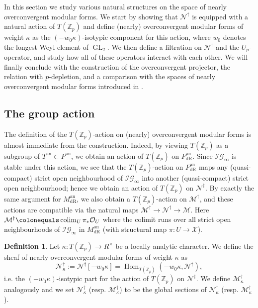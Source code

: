 \documentclass[10pt, oneside]{amsart}
\newcommand{\defeq}{\colonequals}
\numberwithin{equation}{subsection}
\theoremstyle{definition}
\newtheorem{definition}[equation]{Definition}
\theoremstyle{remark}
\newcommand{\mbb}[1]{\mathbb{#1}}
\newcommand{\opn}[1]{\operatorname{#1}}
\begin{document}
In this section we study various natural structures on the space of nearly overconvergent modular forms. We start by showing that $\mathcal{N}^\dagger$ is equipped with a natural action of $T(\mbb{Z}_p)$ and define (nearly) overconvergent modular forms of weight $\kappa$ as the $(-w_0\kappa)$-isotypic component for this action, where $w_0$ denotes the longest Weyl element of $\opn{GL}_2$. We then define a filtration on $\mathcal{N}^\dagger$ and the $U_p$-operator, and study how all of these operators interact with each other. We will finally conclude with the construction of the overconvergent projector, the relation with $p$-depletion, and a comparison with the spaces of nearly overconvergent modular forms introduced in \cite{AI_LLL}.


\subsection{The group action}

The definition of the $T(\mbb{Z}_p)$-action on (nearly) overconvergent modular forms is almost immediate from the construction. Indeed, by viewing $T(\mbb{Z}_p)$ as a subgroup of $T^{\opn{an}} \subset P^{\opn{an}}$, we obtain an action of $T(\mbb{Z}_p)$ on $P_{\opn{dR}}^{\opn{an}}$. Since $\mathcal{IG}_{\infty}$ is stable under this action, we see that the $T(\mbb{Z}_p)$-action on $P_{\opn{dR}}^{\opn{an}}$ maps any (quasi-compact) strict open neighbourhood of $\mathcal{IG}_{\infty}$ into another (quasi-compact) strict open neighbourhood; hence we obtain an action of $T(\mbb{Z}_p)$ on $\mathcal{N}^{\dagger}$. By exactly the same argument for $M_{\opn{dR}}^{\opn{an}}$, we also obtain a $T(\mbb{Z}_p)$-action on $\mathcal{M}^{\dagger}$, and these actions are compatible via the natural maps $\mathcal{M}^{\dagger} \to \mathcal{N}^{\dagger} \to \mathcal{M}$. Here $\mathcal{M}^{\dagger} \defeq \opn{colim}_U \pi_* \mathcal{O}_U$ where the colimit runs over all strict open neighbourhoods of $\mathcal{IG}_{\infty}$ in $M_{\opn{dR}}^{\opn{an}}$ (with structural map $\pi \colon U \to \mathcal{X}$).  

\begin{definition} \label{DefNearlyOCModFormsWeight}
Let $\kappa \colon T(\mbb{Z}_p) \to R^\times$ be a locally analytic character. We define the sheaf of nearly overconvergent modular forms of weight $\kappa$ as
\[ \mathcal{N}^\dagger_\kappa := \mathcal{N}^\dagger[-w_0\kappa] = \opn{Hom}_{T(\mbb{Z}_p)}(-w_0\kappa, \mathcal{N}^{\dagger}), \]
i.e. the $(-w_0\kappa)$-isotypic part for the action of $T(\mbb{Z}_p)$ on $\mathcal{N}^\dagger$. We define $\mathcal{M}^\dagger_\kappa$ analogously and we set $\mathscr{N}^{\dagger}_{\kappa}$ (resp. $\mathscr{M}^{\dagger}_{\kappa}$) to be the global sections of $\mathcal{N}^{\dagger}_{\kappa}$ (resp. $\mathcal{M}^{\dagger}_{\kappa}$).
\end{definition}
\end{document}
